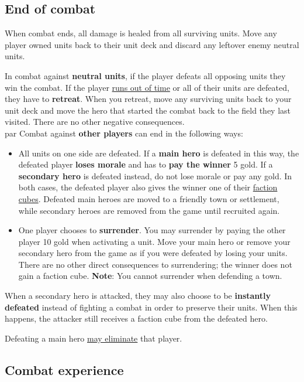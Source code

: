 \subsection*{\hypertarget{Endcombat}{End of combat}}
When combat ends, all damage is healed from all surviving units.
Move any player owned units back to their unit deck and discard any leftover enemy neutral units.\par
In combat against \textbf{neutral units}, if the player defeats all opposing units they win the combat.
If the player \hyperlink{Timelimit}{runs out of time} or all of their units are defeated, they have to \textbf{retreat}.
When you retreat, move any surviving units back to your unit deck and move the hero that started the combat back to the field they last visited.
There are no other negative consequences.\\par
Combat against \textbf{other players} can end in the following ways:
\begin{itemize}
  \item All units on one side are defeated.
    If a \textbf{main hero} is defeated in this way, the defeated player \textbf{loses morale} and has to \textbf{pay the winner} 5 gold.
    If a \textbf{secondary hero} is defeated instead, do not lose morale or pay any gold.
    In both cases, the defeated player also gives the winner one of their \hyperlink{End}{faction cubes}.
    Defeated main heroes are moved to a friendly town or settlement, while secondary heroes are removed from the game until recruited again.
  \item One player chooses to \textbf{surrender}.
You may surrender by paying the other player 10 gold when activating a unit.
Move your main hero or remove your secondary hero from the game as if you were defeated by losing your units.
There are no other direct consequences to surrendering; the winner does not gain a faction cube.
\textbf{Note}: You cannot surrender when defending a town.
\end{itemize}
When a secondary hero is attacked, they may also choose to be \textbf{instantly defeated} instead of fighting a combat in order to preserve their units.
When this happens, the attacker still receives a faction cube from the defeated hero.\par Defeating a main hero \hyperlink{End}{may eliminate} that player.

\subsection*{\hypertarget{Combatexperience}{Combat experience}}

